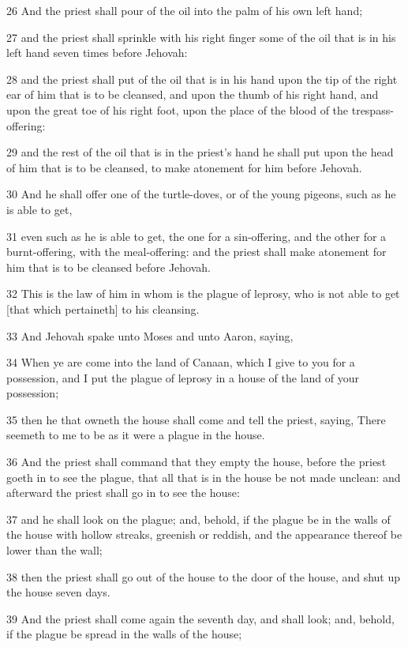 \par 26 And the priest shall pour of the oil into the palm of his own left hand;
\par 27 and the priest shall sprinkle with his right finger some of the oil that is in his left hand seven times before Jehovah:
\par 28 and the priest shall put of the oil that is in his hand upon the tip of the right ear of him that is to be cleansed, and upon the thumb of his right hand, and upon the great toe of his right foot, upon the place of the blood of the trespass-offering:
\par 29 and the rest of the oil that is in the priest's hand he shall put upon the head of him that is to be cleansed, to make atonement for him before Jehovah.
\par 30 And he shall offer one of the turtle-doves, or of the young pigeons, such as he is able to get,
\par 31 even such as he is able to get, the one for a sin-offering, and the other for a burnt-offering, with the meal-offering: and the priest shall make atonement for him that is to be cleansed before Jehovah.
\par 32 This is the law of him in whom is the plague of leprosy, who is not able to get [that which pertaineth] to his cleansing.
\par 33 And Jehovah spake unto Moses and unto Aaron, saying,
\par 34 When ye are come into the land of Canaan, which I give to you for a possession, and I put the plague of leprosy in a house of the land of your possession;
\par 35 then he that owneth the house shall come and tell the priest, saying, There seemeth to me to be as it were a plague in the house.
\par 36 And the priest shall command that they empty the house, before the priest goeth in to see the plague, that all that is in the house be not made unclean: and afterward the priest shall go in to see the house:
\par 37 and he shall look on the plague; and, behold, if the plague be in the walls of the house with hollow streaks, greenish or reddish, and the appearance thereof be lower than the wall;
\par 38 then the priest shall go out of the house to the door of the house, and shut up the house seven days.
\par 39 And the priest shall come again the seventh day, and shall look; and, behold, if the plague be spread in the walls of the house;

